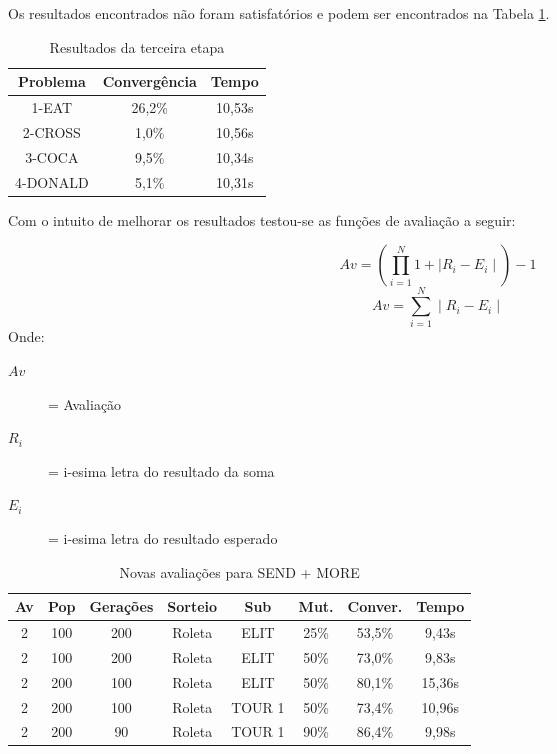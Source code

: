 \documentclass[a4paper, 12pt]{article}
\begin{document}
Os resultados encontrados não foram satisfatórios e podem ser encontrados na
Tabela \ref{tab:etapa3}.

  \begin{table}[h]
    \centering
    \begin{tabular}{|c|c|c|}
      \hline
      Problema & Convergência & Tempo \\
      \hline
      1-EAT & 26,2\% & 10,53s \\
      \hline
      2-CROSS & 1,0\% & 10,56s \\
      \hline
      3-COCA & 9,5\% & 10,34s \\
      \hline
      4-DONALD & 5,1\% & 10,31s \\
      \hline
    \end{tabular}
    \caption{Resultados da terceira etapa}
    \label{tab:etapa3}
  \end{table}

Com o intuito de melhorar os resultados testou-se as funções de avaliação a seguir:

  \begin{equation}
    Av = (\prod_{i=1}^{N} 1+\mid R_i - E_i\mid) -1
    \label{eq:avprod}
  \end{equation}
  \begin{equation}
    Av = \sum_{i=1}^{N} \mid R_i - E_i\mid
    \label{eq:avdifind}
  \end{equation}
Onde:
  \begin{description}
    \item[\(Av\)] = Avaliação
    \item[\(R_i\)] = i-esima letra do resultado da soma
    \item[\(E_i\)] = i-esima letra do resultado esperado
  \end{description}

  \begin{table}[h]
    \centering
    \begin{tabular}{|c|c|c|c|c|c|c|c|}
      \hline
      Av & Pop & Gerações & Sorteio & Sub & Mut. & Conver. & Tempo  \\
      \hline
      2 & 100 & 200 & Roleta & ELIT & 25\% &53,5\% & 9,43s \\
      \hline
      2 & 100 & 200 & Roleta & ELIT & 50\% &73,0\% & 9,83s \\
      \hline
      2 & 200 & 100 & Roleta & ELIT & 50\% &80,1\% & 15,36s \\
      \hline
      2 & 200 & 100 & Roleta & TOUR 1 & 50\% &73,4\% & 10,96s \\
      \hline
      2 & 200 & 90 & Roleta & TOUR 1 & 90\% &86,4\% & 9,98s \\
      \hline
    \end{tabular}
    \caption{Novas avaliações para SEND + MORE}
    \label{tab:send}
  \end{table}
\end{document}
